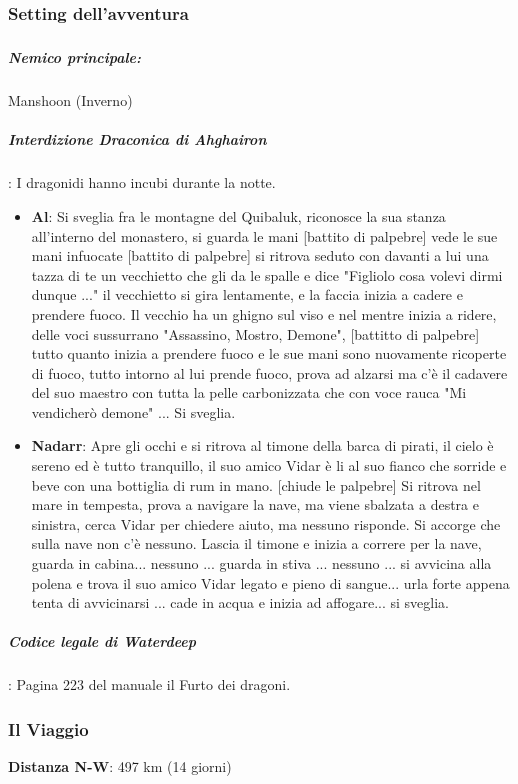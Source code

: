 \documentclass{article}
\begin{document}
            \subsubsection{Setting dell'avventura}
                        \subparagraph{}

                        \subparagraph{Nemico principale: } Manshoon (Inverno)

                        \subparagraph{Interdizione Draconica di Ahghairon}: I dragonidi hanno incubi durante la notte. 
\begin{itemize}
    \item \textbf{Al}: Si sveglia fra le montagne del Quibaluk, riconosce la sua stanza all'interno del monastero, si guarda le mani [battito di palpebre] vede le sue mani infuocate [battito di palpebre] si ritrova seduto con davanti a lui una tazza di te un vecchietto che gli da le spalle e dice "Figliolo cosa volevi dirmi dunque ..." il vecchietto si gira lentamente, e la faccia inizia a cadere e prendere fuoco. Il vecchio ha un ghigno sul viso e nel mentre inizia a ridere, delle voci sussurrano "Assassino, Mostro, Demone", [battitto di palpebre] tutto quanto inizia a prendere fuoco e le sue mani sono nuovamente ricoperte di fuoco, tutto intorno al lui prende fuoco, prova ad alzarsi ma c'è il cadavere del suo maestro con tutta la pelle carbonizzata che con voce rauca "Mi vendicherò demone" ... Si sveglia.
    \item \textbf{Nadarr}: Apre gli occhi e si ritrova al timone della barca di pirati, il cielo è sereno ed è tutto tranquillo, il suo amico Vidar è li al suo fianco che sorride e beve con una bottiglia di rum in mano. [chiude le palpebre] Si ritrova nel mare in tempesta, prova a navigare la nave, ma viene sbalzata a destra e sinistra, cerca Vidar per chiedere aiuto, ma nessuno risponde. Si accorge che sulla nave non c'è nessuno. Lascia il timone e inizia a correre per la nave, guarda in cabina... nessuno ... guarda in stiva ... nessuno ... si avvicina alla polena e trova il suo amico Vidar legato e pieno di sangue... urla forte appena tenta di avvicinarsi ... cade in acqua e inizia ad affogare... si sveglia. 
\end{itemize}


                        \subparagraph{Codice legale di Waterdeep}:  Pagina 223 del manuale il Furto dei dragoni.

            \subsubsection{Il Viaggio}
\textbf{Distanza N-W}: 497 km (14 giorni) 
\end{document}
